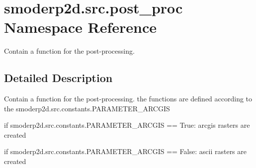 \hypertarget{namespacesmoderp2d_1_1src_1_1post__proc}{\section{smoderp2d.\-src.\-post\-\_\-proc Namespace Reference}
\label{namespacesmoderp2d_1_1src_1_1post__proc}
}


Contain a function for the post-\/processing.  




\subsection{Detailed Description}
Contain a function for the post-\/processing. the functions are defined according to the smoderp2d.\-src.\-constants.\-P\-A\-R\-A\-M\-E\-T\-E\-R\-\_\-\-A\-R\-C\-G\-I\-S \par
 if smoderp2d.\-src.\-constants.\-P\-A\-R\-A\-M\-E\-T\-E\-R\-\_\-\-A\-R\-C\-G\-I\-S == True\-: arcgis rasters are created \par
 \par
 if smoderp2d.\-src.\-constants.\-P\-A\-R\-A\-M\-E\-T\-E\-R\-\_\-\-A\-R\-C\-G\-I\-S == False\-: ascii rasters are created \par

